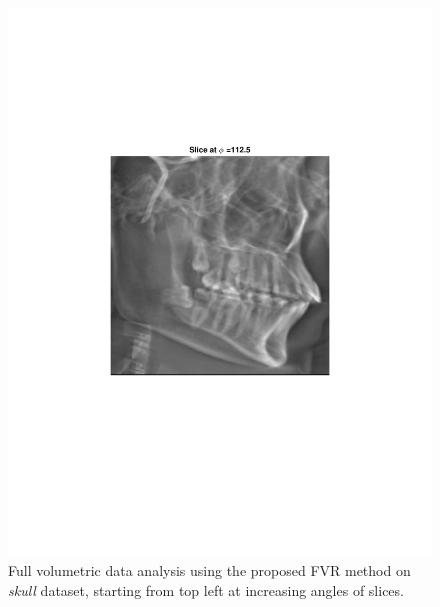 \documentclass{UCF_ETD}
\begin{document}
\begin{figure}[H]
\begin{center}
\includegraphics[scale=0.5]{FVR/CompCT_2Slice113}
\caption{Full volumetric data analysis using the proposed FVR method on \emph{skull} dataset, starting from top left at increasing angles of slices.}
\label{FullVolumetricData2.fig}
\end{center}
\end{figure}
\end{document}
